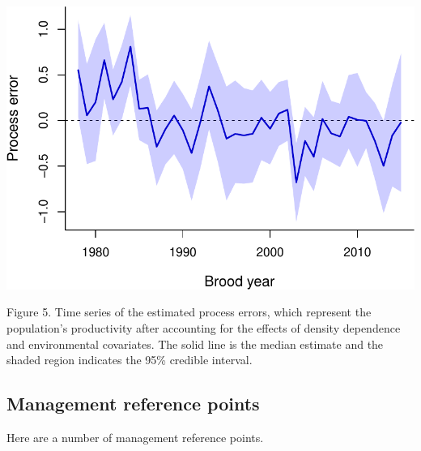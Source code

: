\documentclass[11pt,]{article}
\begin{document}
\begin{center}\includegraphics{App_3_Summarize_results_files/figure-latex/fig_5_proc_err-1} \end{center}

Figure 5. Time series of the estimated process errors, which represent
the population's productivity after accounting for the effects of
density dependence and environmental covariates. The solid line is the
median estimate and the shaded region indicates the 95\% credible
interval.

\hypertarget{management-reference-points}{%
\subsection{Management reference
points}\label{management-reference-points}}

Here are a number of management reference points.
\end{document}
